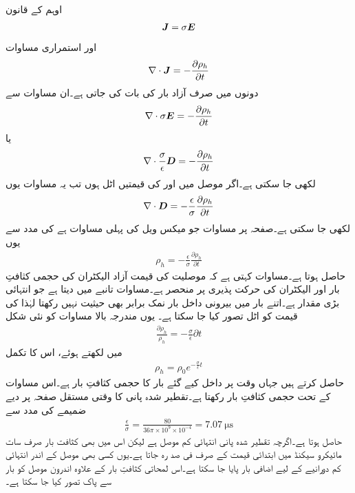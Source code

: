 اوہم کے قانون
\begin{align*}
{\ensuremath{{\boldsymbol{J}}}}=\sigma {\ensuremath{{\boldsymbol{E}}}}
\end{align*}
اور استمراری مساوات
\begin{align*}
\nabla \cdot {\ensuremath{{\boldsymbol{J}}}}=-\frac{\partial \rho_h}{\partial t}
\end{align*} 
دونوں میں صرف آزاد بار کی بات کی جاتی ہے۔ان مساوات سے
\begin{align*}
\nabla \cdot \sigma {\ensuremath{{\boldsymbol{E}}}}=-\frac{\partial \rho_h}{\partial t}
\end{align*} 
یا
\begin{align*}
\nabla \cdot \frac{\sigma}{\epsilon} {{\boldsymbol{D}}}=-\frac{\partial \rho_h}{\partial t}
\end{align*} 
لکھی جا سکتی ہے۔اگر موصل میں  اور  کی قیمتیں اٹل ہوں تب یہ مساوات یوں
\begin{align*}
\nabla \cdot  {\ensuremath{{\boldsymbol{D}}}}=-\frac{\epsilon}{\sigma}\frac{\partial \rho_h}{\partial t}
\end{align*} 
لکھی جا سکتی ہے۔صفحہ  پر مساوات  جو میکس ویل کی پہلی مساوات ہے کی مدد سے یوں
\begin{align*}
\rho_h=-\frac{\epsilon}{\sigma}\frac{\partial \rho_h}{\partial t}
\end{align*} 
حاصل ہوتا ہے۔مساوات  کہتی ہے کہ موصلیت کی قیمت آزاد الیکٹران کی حجمی کثافتِ بار  اور الیکٹران کی حرکت پذیری پر منحصر ہے۔مساوات  تانبے میں  دیتا ہے جو انتہائی بڑی مقدار ہے۔اتنے بار میں بیرونی داخل بار نمک برابر بھی حیثیت نہیں رکھتا لہٰذا  کی قیمت کو اٹل تصور کیا جا سکتا ہے۔ یوں مندرجہ بالا مساوات کو نئی شکل
\begin{align*}
\frac{\partial \rho_h}{\rho_h}=-\frac{\sigma}{\epsilon} \partial t
\end{align*} 
میں لکھتے ہوئے، اس کا تکمل
\begin{align*}
\rho_h=\rho_0 e^{-\frac{\sigma}{\epsilon}t}
\end{align*}
 حاصل کرتے ہیں جہاں وقت  پر داخل کیے گئے بار کا حجمی کثافتِ بار  ہے۔اس مساوات کے تحت حجمی کثافتِ بار   رکھتا ہے۔تقطیر شدہ پانی کا وقتی مستقل صفحہ  پر دیے ضمیمے کی مدد سے
\begin{align*}
\frac{\epsilon}{\sigma}=\frac{80}{36 \pi \times 10^9 \times 10^{-4}}=\SI{7.07}{\micro \second}
\end{align*}
حاصل ہوتا ہے۔اگرچہ تقطیر شدہ پانی انتہائی کم موصل ہے لیکن اس میں بھی  کثافت بار صرف سات مائیکرو سیکنڈ میں ابتدائی قیمت کے صرف   فی صد رہ جاتا ہے۔یوں کسی بھی موصل کے اندر انتہائی کم دورانیے کے لیے اضافی بار پایا جا سکتا ہے۔اس لمحاتی کثافتِ بار کے علاوہ اندرون موصل  کو بار سے پاک تصور کیا جا سکتا ہے۔

